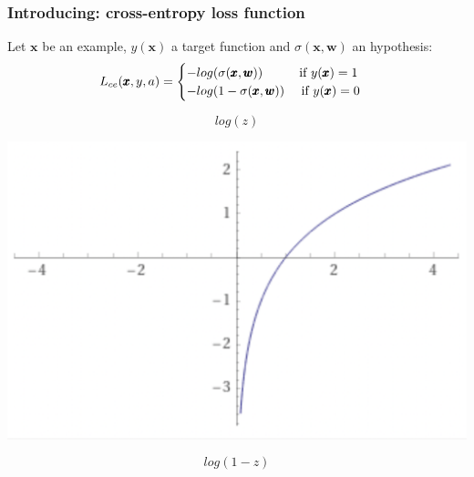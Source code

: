 \documentclass[usenames,dvipsnames]{beamer}
\begin{document}
\begin{frame}
  \frametitle{Introducing: cross-entropy loss function}
  
  
  \begin{definition}
  Let $\pmb{x}$ be an example, $y(\pmb{x})$ a target function and $\sigma(\pmb{x}, \pmb{w})$ an hypothesis:
  	\[
  	L_{ce}(\pmb{x}, y, a) = 
  	\begin{cases}
  		-log(\sigma(\pmb{x}, \pmb{w})) \quad \quad \; \; \text{ if } y(\pmb{x})=1 \\
  		-log(1 - \sigma(\pmb{x}, \pmb{w})) \quad \text{ if } y(\pmb{x})=0
  	\end{cases}
  	\]
  \end{definition}
  
  \medskip \pause

\begin{minipage}[c]{0.5\textwidth}
	\centering
	
	\[log(z)\]
	
	\includegraphics[scale=.25]{log2x}
\end{minipage}\begin{minipage}[c]{0.5\textwidth}
	\centering
	
	\[log(1-z)\]
	

\end{minipage}
\end{frame}
\end{document}
